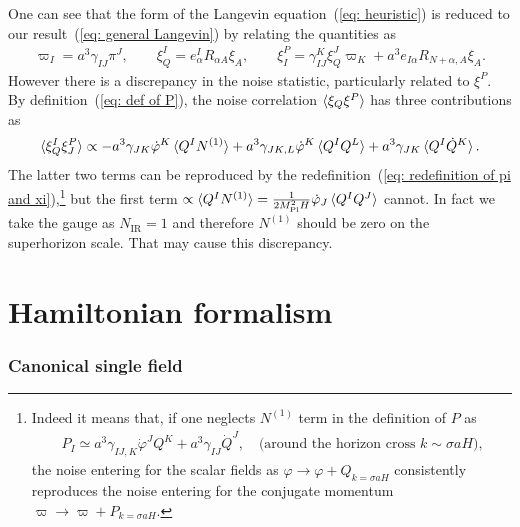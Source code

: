 \documentclass[aps, prd
, preprint
, nofootinbib 
]{revtex4-1}
\newcommand{\Mpl}{M_\text{Pl}}
\newcommand{\bae}[1]{\begin{align} #1 \end{align}}
\begin{document}
One can see that the form of the Langevin equation~(\ref{eq: heuristic}) is reduced to our result~(\ref{eq: general Langevin})
by relating the quantities as
\bae{\label{eq: redefinition of pi and xi}
	\varpi_I=a^3\gamma_{IJ}\pi^J, \quad\quad \xi^I_Q=e^I_\alpha R_{\alpha A}\xi_A, \quad\quad 
	\xi^P_I=\gamma^K_{IJ}\xi^J_Q\varpi_K+a^3e_{I\alpha}R_{N+\alpha,A}\xi_A.
}
However there is a discrepancy in the noise statistic, particularly related to $\xi^P$.
By definition~(\ref{eq: def of P}), the noise correlation $\braket{\xi_Q\xi^P}$ has three contributions as
\bae{
	\braket{\xi_Q^I\xi^P_J}\propto-a^3\gamma_{JK}\dot{\varphi}^K\braket{Q^IN^{(1)}}+a^3\gamma_{JK,L}\dot{\varphi}^K\braket{Q^IQ^L}
	+a^3\gamma_{JK}\braket{Q^I\dot{Q}^K}.
}
The latter two terms can be reproduced by the redefinition~(\ref{eq: redefinition of pi and xi}),\footnote{Indeed it means that, if one neglects
$N^{(1)}$ term in the definition of $P$ as
\bae{
	P_I\simeq a^3\gamma_{IJ,K}\dot{\varphi}^JQ^K+a^3\gamma_{IJ}\dot{Q}^J, \quad \text{(around the horizon cross $k\sim\sigma aH$),}
}
the noise entering for the scalar fields as $\varphi\to\varphi+Q_{k=\sigma aH}$ consistently reproduces the noise entering for the conjugate momentum
$\varpi\to\varpi+P_{k=\sigma aH}$.
}
but the first term $\propto\braket{Q^IN^{(1)}}=\frac{1}{2\Mpl^2H}\dot{\varphi}_J\braket{Q^IQ^J}$ cannot.
In fact we take the gauge as $N_\text{IR}=1$ and therefore $N^{(1)}$ should be zero on the superhorizon scale.
That may cause this discrepancy.


\newpage
\part{Hamiltonian formalism}

\section{Canonical single field}
\end{document}
